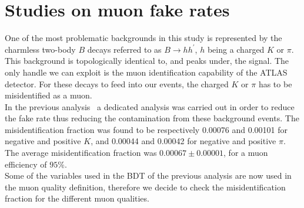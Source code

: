 \section{Studies on muon fake rates}
\label{sec:MuonFakes}
One of the most problematic backgrounds in this study is represented
by the charmless two-body $B$ decays referred to as $B \to hh^\prime$,
$h$ being a charged $K$ or $\pi$. This background is topologically
identical to, and peaks under, the signal. 
The only handle we can exploit is the muon identification
capability of the ATLAS detector. For these decays to feed into
our events, the charged $K$ or $\pi$ has to be misidentified as a
muon. \\
In the previous analysis~\cite{Alpigiani:1756291} a dedicated analysis was carried out in order to reduce the fake rate thus reducing the contamination
from these background events. The misidentification fraction was found to be respectively 0.00076 
and 0.00101 for negative and positive $K$, and 0.00044 and 0.00042 for
 negative and positive $\pi$. The average misidentification fraction was $0.00067 \pm 0.00001$, for a muon efficiency of $95\%$.\\
Some of the variables used in the BDT of the previous analysis are now used in the muon quality definition, 
therefore we decide to check the misidentification fraction for the different muon qualities.\\


